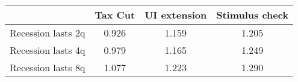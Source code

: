 \begin{tabular}{@{}lccc@{}} 
\toprule 
& Tax Cut    & UI extension    & Stimulus check    \\  \midrule 
Recession lasts 2q &0.926  & 1.159  & 1.205     \\ 
Recession lasts 4q &0.979  & 1.165  & 1.249     \\ 
Recession lasts 8q &1.077  & 1.223  & 1.290     \\ 
\end{tabular}  
